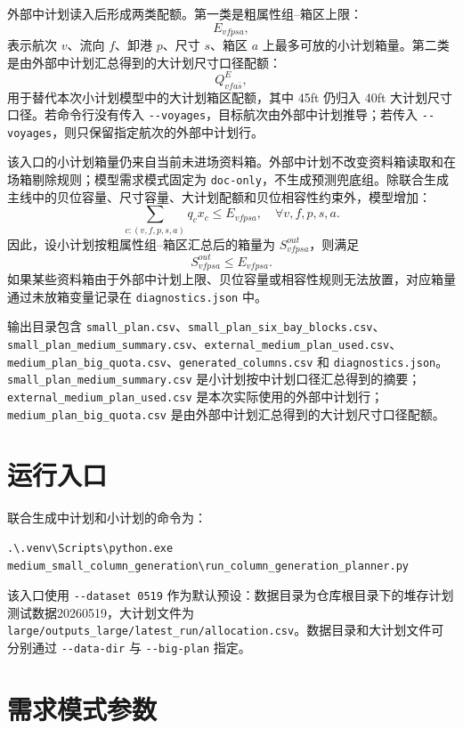 \documentclass[UTF8,a4paper,11pt]{ctexart}
\newcommand{\code}[1]{\nolinkurl{#1}}
\begin{document}
外部中计划读入后形成两类配额。第一类是粗属性组--箱区上限：
\[
E_{vfpsa},
\]
表示航次 \(v\)、流向 \(f\)、卸港 \(p\)、尺寸 \(s\)、箱区 \(a\) 上最多可放的小计划箱量。第二类是由外部中计划汇总得到的大计划尺寸口径配额：
\[
Q^{E}_{vfa\bar{s}},
\]
用于替代本次小计划模型中的大计划箱区配额，其中 45ft 仍归入 40ft 大计划尺寸口径。若命令行没有传入 \code{--voyages}，目标航次由外部中计划推导；若传入 \code{--voyages}，则只保留指定航次的外部中计划行。

该入口的小计划箱量仍来自当前未进场资料箱。外部中计划不改变资料箱读取和在场箱剔除规则；模型需求模式固定为 \code{doc-only}，不生成预测兜底组。除联合生成主线中的贝位容量、尺寸容量、大计划配额和贝位相容性约束外，模型增加：
\[
\sum_{c:(v,f,p,s,a)} q_cx_c \le E_{vfpsa},\quad \forall v,f,p,s,a.
\]
因此，设小计划按粗属性组--箱区汇总后的箱量为 \(S^{out}_{vfpsa}\)，则满足
\[
S^{out}_{vfpsa}\le E_{vfpsa}.
\]
如果某些资料箱由于外部中计划上限、贝位容量或相容性规则无法放置，对应箱量通过未放箱变量记录在 \code{diagnostics.json} 中。

输出目录包含 \code{small_plan.csv}、\code{small_plan_six_bay_blocks.csv}、\code{small_plan_medium_summary.csv}、\code{external_medium_plan_used.csv}、\code{medium_plan_big_quota.csv}、\code{generated_columns.csv} 和 \code{diagnostics.json}。\code{small_plan_medium_summary.csv} 是小计划按中计划口径汇总得到的摘要；\code{external_medium_plan_used.csv} 是本次实际使用的外部中计划行；\code{medium_plan_big_quota.csv} 是由外部中计划汇总得到的大计划尺寸口径配额。

\section{运行入口}

联合生成中计划和小计划的命令为：
\begin{lstlisting}
.\.venv\Scripts\python.exe medium_small_column_generation\run_column_generation_planner.py
\end{lstlisting}

该入口使用 \code{--dataset 0519} 作为默认预设：数据目录为仓库根目录下的堆存计划测试数据20260519，大计划文件为 \code{large/outputs_large/latest_run/allocation.csv}。数据目录和大计划文件可分别通过 \code{--data-dir} 与 \code{--big-plan} 指定。

\section{需求模式参数}
\end{document}
